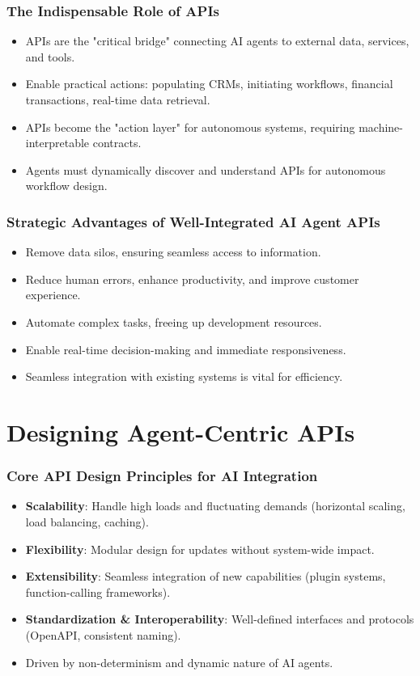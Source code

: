 \documentclass{beamer}       %
\begin{document}
\begin{frame}
    \frametitle{The Indispensable Role of APIs}
    \begin{itemize}
        \item APIs are the "critical bridge" connecting AI agents to external data, services, and tools.
        \item Enable practical actions: populating CRMs, initiating workflows, financial transactions, real-time data retrieval.
        \item APIs become the "action layer" for autonomous systems, requiring machine-interpretable contracts.
        \item Agents must dynamically discover and understand APIs for autonomous workflow design.
    \end{itemize}
\end{frame}

\begin{frame}
    \frametitle{Strategic Advantages of Well-Integrated AI Agent APIs}
    \begin{itemize}
        \item Remove data silos, ensuring seamless access to information.
        \item Reduce human errors, enhance productivity, and improve customer experience.
        \item Automate complex tasks, freeing up development resources.
        \item Enable real-time decision-making and immediate responsiveness.
        \item Seamless integration with existing systems is vital for efficiency.
    \end{itemize}
\end{frame}

\section{Designing Agent-Centric APIs}

\begin{frame}
    \frametitle{Core API Design Principles for AI Integration}
    \begin{itemize}
        \item \textbf{Scalability}: Handle high loads and fluctuating demands (horizontal scaling, load balancing, caching).
        \item \textbf{Flexibility}: Modular design for updates without system-wide impact.
        \item \textbf{Extensibility}: Seamless integration of new capabilities (plugin systems, function-calling frameworks).
        \item \textbf{Standardization \& Interoperability}: Well-defined interfaces and protocols (OpenAPI, consistent naming).
        \item Driven by non-determinism and dynamic nature of AI agents.
    \end{itemize}
\end{frame}
\end{document}
